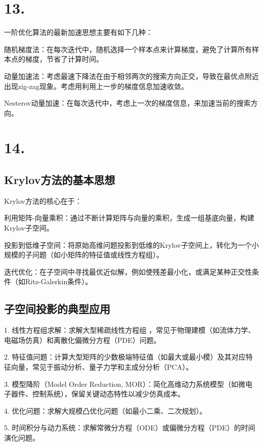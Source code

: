 \documentclass{article}
\begin{document}
	\section*{13.}

	一阶优化算法的最新加速思想主要有如下几种：

	随机梯度法：在每次迭代中，随机选择一个样本点来计算梯度，避免了计算所有样本点的梯度，节省了计算时间。

	动量加速法：考虑最速下降法在由于相邻两次的搜索方向正交，导致在最优点附近出现zig-zag现象。考虑用利用上一步的梯度信息加速收敛。
    
	Nesterov动量加速：在每次迭代中，考虑上一次的梯度信息，来加速当前的搜索方向。

    \section*{14.}

    \subsection*{Krylov方法的基本思想}

    Krylov方法的核心在于：

    利用矩阵-向量乘积：通过不断计算矩阵与向量的乘积，生成一组基底向量，构建Krylov子空间。

    投影到低维子空间：将原始高维问题投影到低维的Krylov子空间上，转化为一个小规模的子问题（如小矩阵的特征值或线性方程组）。

    迭代优化：在子空间中寻找最优近似解，例如使残差最小化，或满足某种正交性条件（如Ritz-Galerkin条件）。

    \subsection*{子空间投影的典型应用}

    1. 线性方程组求解：求解大型稀疏线性方程组 ，常见于物理建模（如流体力学、电磁场仿真）和离散化偏微分方程（PDE）问题。

    2. 特征值问题：计算大型矩阵的少数极端特征值（如最大或最小模）及其对应特征向量，常见于振动分析、量子力学和主成分分析（PCA）。

    3. 模型降阶（Model Order Reduction, MOR）：简化高维动力系统模型（如微电子器件、控制系统），保留关键动态特性以减少仿真成本。

    4. 优化问题：求解大规模凸优化问题（如最小二乘、二次规划）。

    5. 时间积分与动力系统：求解常微分方程（ODE）或偏微分方程（PDE）的时间演化问题。
\end{document}
